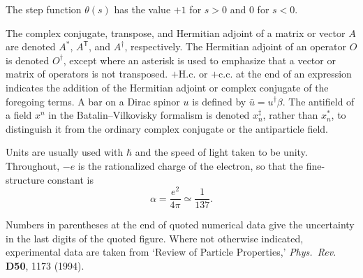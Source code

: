 The step function \(\theta(s)\) has the value \(+1\) for \(s>0\) and \(0\) for
\(s<0\).

The complex conjugate, transpose, and Hermitian adjoint of a matrix or vector
\(A\) are denoted \(A^*\), \(A^{\mathsf T}\), and \(A^\dagger\), respectively.
The Hermitian adjoint of an operator \(O\) is denoted \(O^\dagger\), except
where an asterisk is used to emphasize that a vector or matrix of operators is
not transposed. \(+\mathrm{H.c.}\) or \(+\mathrm{c.c.}\) at the end of an
expression indicates the addition of the Hermitian adjoint or complex
conjugate of the foregoing terms. A bar on a Dirac spinor \(u\) is defined by
\(\bar u=u^\dagger\beta\). The antifield of a field \(x^n\) in the
Batalin--Vilkovisky formalism is denoted \(x_n^{\ddagger}\), rather than
\(x_n^*\), to distinguish it from the ordinary complex conjugate or the
antiparticle field.

Units are usually used with \(\hbar\) and the speed of light taken to be unity.
Throughout, \(-e\) is the rationalized charge of the electron, so that the
fine-structure constant is
\[
  \alpha=\frac{e^2}{4\pi}\simeq\frac{1}{137}.
\]

Numbers in parentheses at the end of quoted numerical data give the
uncertainty in the last digits of the quoted figure. Where not otherwise
indicated, experimental data are taken from `Review of Particle Properties,'
\emph{Phys.\ Rev.} \textbf{D50}, 1173 (1994).

